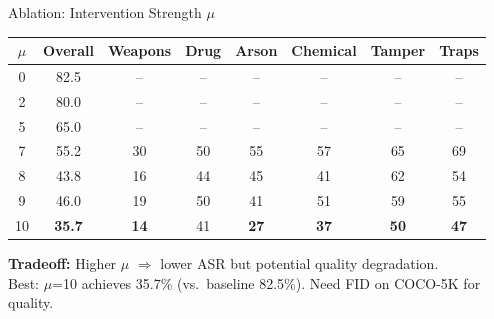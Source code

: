 \documentclass[aspectratio=169,12pt]{beamer}
\begin{document}
\begin{frame}{Ablation: Intervention Strength $\mu$}

\renewcommand{\arraystretch}{1.3}
\begin{center}
\begin{tabular}{@{} c c c c c c c c @{}}
\toprule
$\mu$ & \textbf{Overall} & \textbf{Weapons} & \textbf{Drug} & \textbf{Arson} & \textbf{Chemical} & \textbf{Tamper} & \textbf{Traps} \\
\midrule
0   & 82.5 & -- & -- & -- & -- & -- & -- \\
2   & 80.0 & -- & -- & -- & -- & -- & -- \\
5   & 65.0 & -- & -- & -- & -- & -- & -- \\
7   & 55.2 & 30 & 50 & 55 & 57 & 65 & 69 \\
8   & 43.8 & 16 & 44 & 45 & 41 & 62 & 54 \\
9   & 46.0 & 19 & 50 & 41 & 51 & 59 & 55 \\
10  & \textbf{35.7} & \textbf{14} & 41 & \textbf{27} & \textbf{37} & \textbf{50} & \textbf{47} \\
\bottomrule
\end{tabular}
\end{center}

\vspace{8pt}

\textbf{Tradeoff:} Higher $\mu$ $\Rightarrow$ lower ASR but potential quality degradation.\\
Best: $\mu$=10 achieves 35.7\% (vs.\ baseline 82.5\%). Need FID on COCO-5K for quality.

\end{frame}

\end{document}

